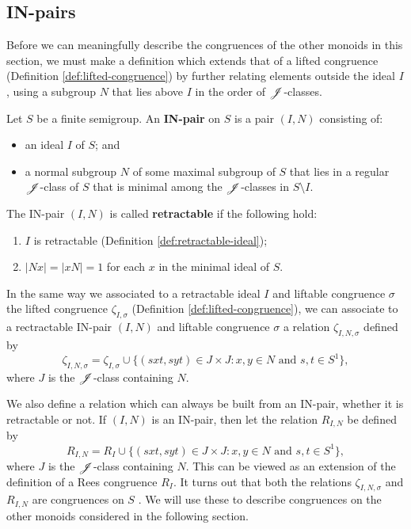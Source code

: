 \subsection{IN-pairs}
\label{sec:in-pairs}
Before we can meaningfully describe the congruences of the other monoids in this
section, we must make a definition which extends that of a lifted congruence
(Definition \ref{def:lifted-congruence}) by further relating elements outside
the ideal $I$, using a subgroup $N$ that lies above $I$ in the order of
$\mathrel{\mathscr{J}}$-classes.

\begin{definition}
  \label{def:in-pair}
   Let $S$ be a finite semigroup.  An \textbf{IN-pair} on
  $S$ is a pair $(I,N)$ consisting of:
  \begin{itemize}
  \item an ideal $I$ of $S$; and
  \item a normal subgroup $N$ of some maximal subgroup of $S$ that lies in a
    regular $\mathrel{\mathscr{J}}$-class of $S$ that is minimal among the $\mathrel{\mathscr{J}}$-classes in
    $S \setminus I$.
  \end{itemize}
  The IN-pair $(I,N)$ is called \textbf{retractable} if the following hold:
  \begin{enumerate}[\rm(i)]
  \item $I$ is retractable (Definition \ref{def:retractable-ideal});
  \item $|Nx| = |xN| = 1$ for each $x$ in the minimal ideal of $S$.
  \end{enumerate}
\end{definition}

In the same way we associated to a retractable ideal $I$ and liftable congruence
$\sigma$ the lifted congruence $\zeta_{I,\sigma}$ (Definition
\ref{def:lifted-congruence}), we can associate to a rectractable IN-pair $(I,N)$
and liftable congruence $\sigma$ a relation $\zeta_{I,N,\sigma}$ defined by
$$\zeta_{I,N,\sigma} = \zeta_{I,\sigma} \cup
\{(sxt,syt) \in J \times J : x,y \in N \text{~and~} s,t \in S^1\},$$ where $J$
is the $\mathrel{\mathscr{J}}$-class containing $N$.

We also define a relation which can always be built from an IN-pair, whether it
is retractable or not.  If $(I,N)$ is an IN-pair, then let the relation
$R_{I,N}$ be defined by
$$R_{I,N} = R_I \cup
\{(sxt,syt) \in J \times J : x,y \in N \text{~and~} s,t \in S^1\},$$ where $J$
is the $\mathrel{\mathscr{J}}$-class containing $N$.  This can be viewed as an extension of the
definition of a Rees congruence $R_I$.
It turns out that both the relations
$\zeta_{I,N,\sigma}$ and $R_{I,N}$ are congruences on $S$ \cite[Proposition
3.22]{ourpaper}.  We will use these to describe congruences on the other monoids
considered in the following section.

